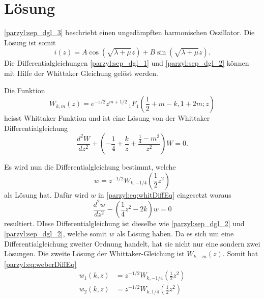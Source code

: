 %
%
%
\section{Lösung
\label{parzyl:section:teil1}}

\eqref{parzyl:sep_dgl_3} beschriebt einen ungedämpften harmonischen Oszillator.
Die Lösung ist somit
\begin{equation}
	i(z) 
	= 
	A\cos{ 
		\left ( 
		\sqrt{\lambda + \mu}z
		\right )}
	+
	B\sin{ 
		\left ( 
		\sqrt{\lambda + \mu}z
		\right )}.
\end{equation}
Die Differentialgleichungen \eqref{parzyl:sep_dgl_1} und \eqref{parzyl:sep_dgl_2} können mit
Hilfe der Whittaker Gleichung gelöst werden.
\begin{definition}
    Die Funktion 
    \begin{equation*}
        W_{k,m}(z) = 
    e^{-z/2} z^{m+1/2} \,
    {}_{1} F_{1}
    (
        {\textstyle \frac{1}{2}} 
        + m - k, 1 + 2m; z)
    \end{equation*}
    heisst Whittaker Funktion und ist eine Lösung
    von der Whittaker Differentialgleichung
    \begin{equation}
        \frac{d^2W}{d z^2} +
        \left(-\frac{1}{4}  + \frac{k}{z} + \frac{\frac{1}{4} - m^2}{z^2} \right) W = 0.
        \label{parzyl:eq:whitDiffEq}
    \end{equation}
\end{definition}
Es wird nun die Differentialgleichung bestimmt, welche
\begin{equation}
    w = z^{-1/2} W_{k,-1/4} \left({\textstyle \frac{1}{2}} z^2\right)
\end{equation}
als Lösung hat.
Dafür wird $w$ in \eqref{parzyl:eq:whitDiffEq} eingesetzt woraus
\begin{equation}
    \frac{d^2 w}{dz^2} - \left(\frac{1}{4} z^2 - 2k\right) w = 0
\label{parzyl:eq:weberDiffEq}
\end{equation}
resultiert. DIese Differentialgleichung ist dieselbe wie 
\eqref{parzyl:sep_dgl_2} und \eqref{parzyl:sep_dgl_2}, welche somit
$w$ als Lösung haben.
Da es sich um eine Differentialgleichung zweiter Ordnung handelt, hat sie nicht nur
eine sondern zwei Lösungen.
Die zweite Lösung der Whittaker-Gleichung ist $W_{k,-m} (z)$.
Somit hat \eqref{parzyl:eq:weberDiffEq}
\begin{align}
    w_1(k, z) & = z^{-1/2} W_{k,-1/4} \left({\textstyle \frac{1}{2}} z^2\right)\\
    w_2(k, z) & = z^{-1/2} W_{k,1/4} \left({\textstyle \frac{1}{2}} z^2\right)
\end{align}
